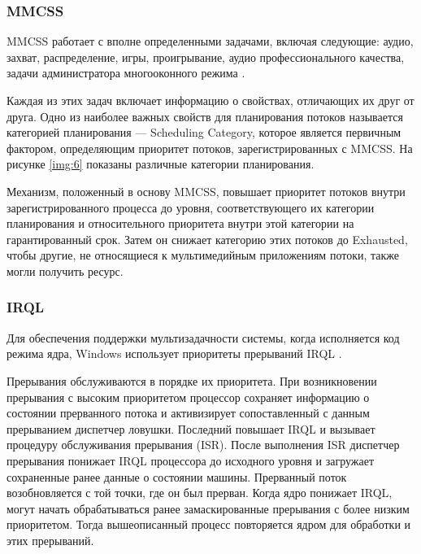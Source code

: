 \subsubsection*{MMCSS}

MMCSS работает с вполне определенными задачами, включая следующие: аудио, захват, распределение, игры, проигрывание, аудио профессионального качества, задачи администратора многооконного режима \cite{win9}.

Каждая из этих задач включает информацию о свойствах, отличающих их друг от друга. Одно из наиболее важных свойств для планирования потоков называется категорией планирования --- Scheduling Category, которое является первичным фактором, определяющим приоритет потоков, зарегистрированных с MMCSS. На рисунке \ref{img:6} показаны различные категории планирования.


\newpage

Механизм, положенный в основу MMCSS, повышает приоритет потоков
внутри зарегистрированного процесса до уровня, соответствующего их категории
планирования и относительного приоритета внутри этой категории на гарантированный срок. Затем он снижает категорию этих потоков до Exhausted, чтобы другие, не относящиеся к мультимедийным приложениям потоки, также могли получить ресурс.

\subsubsection*{IRQL}

Для обеспечения поддержки мультизадачности системы, когда исполняется код режима ядра, Windows использует приоритеты прерываний IRQL \cite{win10}. 

Прерывания обслуживаются в порядке их приоритета. При возникновении прерывания с высоким приоритетом процессор сохраняет информацию о состоянии прерванного потока и активизирует сопоставленный с данным прерыванием диспетчер ловушки. Последний повышает IRQL и вызывает
процедуру обслуживания прерывания (ISR). После выполнения ISR диспетчер прерывания понижает IRQL процессора до исходного уровня и загружает сохраненные ранее данные о состоянии машины. Прерванный поток возобновляется с той точки, где он был прерван. Когда ядро понижает IRQL, могут начать обрабатываться ранее замаскированные прерывания с более низким приоритетом. Тогда вышеописанный процесс повторяется ядром для обработки и этих прерываний.


